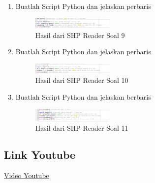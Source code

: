 \begin{enumerate}
    \item Buatlah Script Python dan jelaskan perbaris
    
    \hfill\break
    \begin{figure}[H]
		\includegraphics[width=4cm]{figures/1174051/3/9.png}
		\centering
		\caption{Hasil dari SHP Reader Soal 9}
    \end{figure}

    \item Buatlah Script Python dan jelaskan perbaris
    
    \hfill\break
    \begin{figure}[H]
		\includegraphics[width=4cm]{figures/1174051/3/10.png}
		\centering
		\caption{Hasil dari SHP Reader Soal 10}
    \end{figure}

    \item Buatlah Script Python dan jelaskan berbaris
    
    \hfill\break
    \begin{figure}[H]
		\includegraphics[width=4cm]{figures/1174051/3/11.png}
		\centering
		\caption{Hasil dari SHP Reader Soal 11}
    \end{figure}
\end{enumerate}
\subsection{Link Youtube}
\href{https://youtu.be/TldvcY9GCMA}{Video Youtube}
